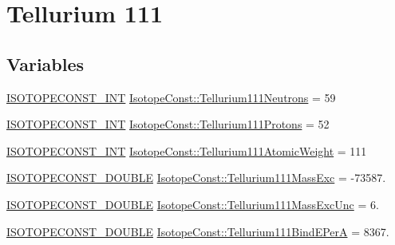 \hypertarget{group___isotope_const-_tellurium-_te111}{}\section{Tellurium 111}
\label{group___isotope_const-_tellurium-_te111}
\subsection*{Variables}
\begin{DoxyCompactItemize}
\item 
\mbox{\hyperlink{group___isotope_const-_macros_ga5f18360b3e99483a35c32d789e62621c}{I\+S\+O\+T\+O\+P\+E\+C\+O\+N\+S\+T\+\_\+\+I\+NT}} \mbox{\hyperlink{group___isotope_const-_tellurium-_te111_gad912eefae7c652df4b2d97da394f132a}{Isotope\+Const\+::\+Tellurium111\+Neutrons}} = 59
\item 
\mbox{\hyperlink{group___isotope_const-_macros_ga5f18360b3e99483a35c32d789e62621c}{I\+S\+O\+T\+O\+P\+E\+C\+O\+N\+S\+T\+\_\+\+I\+NT}} \mbox{\hyperlink{group___isotope_const-_tellurium-_te111_gaa931d88d18c8094c55cda85417264e0f}{Isotope\+Const\+::\+Tellurium111\+Protons}} = 52
\item 
\mbox{\hyperlink{group___isotope_const-_macros_ga5f18360b3e99483a35c32d789e62621c}{I\+S\+O\+T\+O\+P\+E\+C\+O\+N\+S\+T\+\_\+\+I\+NT}} \mbox{\hyperlink{group___isotope_const-_tellurium-_te111_ga035a10b9b73d94a060479738e375d192}{Isotope\+Const\+::\+Tellurium111\+Atomic\+Weight}} = 111
\item 
\mbox{\hyperlink{group___isotope_const-_macros_ga8f45a7272ce02c0b4c65c44636ed719a}{I\+S\+O\+T\+O\+P\+E\+C\+O\+N\+S\+T\+\_\+\+D\+O\+U\+B\+LE}} \mbox{\hyperlink{group___isotope_const-_tellurium-_te111_ga5126306a498fe6717877bcd313a8e3f5}{Isotope\+Const\+::\+Tellurium111\+Mass\+Exc}} = -\/73587.
\item 
\mbox{\hyperlink{group___isotope_const-_macros_ga8f45a7272ce02c0b4c65c44636ed719a}{I\+S\+O\+T\+O\+P\+E\+C\+O\+N\+S\+T\+\_\+\+D\+O\+U\+B\+LE}} \mbox{\hyperlink{group___isotope_const-_tellurium-_te111_gad03802add4248f9bb3a12085df63302e}{Isotope\+Const\+::\+Tellurium111\+Mass\+Exc\+Unc}} = 6.
\item 
\mbox{\hyperlink{group___isotope_const-_macros_ga8f45a7272ce02c0b4c65c44636ed719a}{I\+S\+O\+T\+O\+P\+E\+C\+O\+N\+S\+T\+\_\+\+D\+O\+U\+B\+LE}} \mbox{\hyperlink{group___isotope_const-_tellurium-_te111_ga1014a0b58aae12d2ee393e889910d55d}{Isotope\+Const\+::\+Tellurium111\+Bind\+E\+PerA}} = 8367.
\item 

\end{DoxyCompactItemize}

